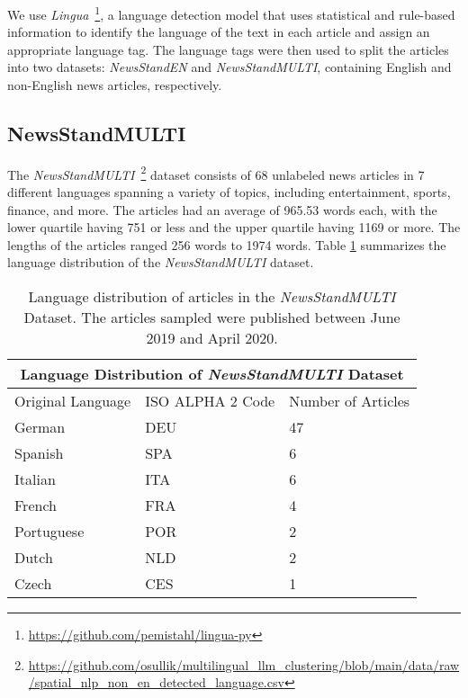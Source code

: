 We use \textit{Lingua}~\footnote{\url{https://github.com/pemistahl/lingua-py}}, a language detection model that uses statistical and rule-based information to identify the language of the text in each article and assign an appropriate language tag.
The language tags were then used to split the articles into two datasets: \emph{NewsStandEN} and \emph{NewsStandMULTI}, containing English and non-English news articles, respectively.

\subsection{NewsStandMULTI}

The \emph{NewsStandMULTI}~\footnote{\url{https://github.com/osullik/multilingual_llm_clustering/blob/main/data/raw/spatial_nlp_non_en_detected_language.csv}} dataset consists of 68 unlabeled news articles in 7 different languages spanning a variety of topics, including entertainment, sports, finance, and more.
The articles had an average of 965.53 words each, with the lower quartile having 751 or less and the upper quartile having 1169 or more.
The lengths of the articles ranged 256 words to 1974 words.
Table \ref{table:newsstandlarge-stats} summarizes the language distribution of the \emph{NewsStandMULTI} dataset.

\begin{table}[ht!]
\centering
\begin{tabular}{ p{2.5cm} p{2cm} p{1.5cm}  }
 \multicolumn{3}{c}{\textbf{Language Distribution of \emph{NewsStandMULTI} Dataset}} \\
 \hline
 Original Language & ISO ALPHA 2 Code & Number of Articles\\
 \hline
 German             & DEU     & 47\\
 Spanish            & SPA     & 6\\
 Italian            & ITA     & 6\\
 French             & FRA     & 4\\
 Portuguese         & POR     & 2\\
 Dutch              & NLD     & 2\\
 Czech              & CES     & 1
\end{tabular}
\caption{Language distribution of articles in the \emph{NewsStandMULTI} Dataset. The articles sampled were published between June 2019 and April 2020.}
\label{table:newsstandlarge-stats}
\end{table}



